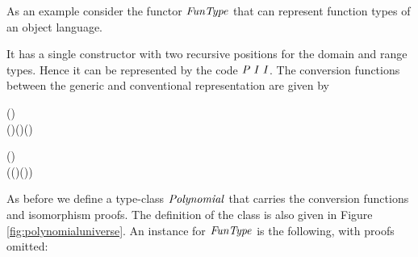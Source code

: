 As an example consider the functor \ensuremath{\Conid{FunType}} that can represent
function types of an object language.
\begin{hscode}\SaveRestoreHook
{}%
%
%
\>[3]{}\;\;\mathrel{=}\;\;\<[E]%
\ColumnHook
\end{hscode}\resethooks
It has a single constructor with two recursive positions for the
domain and range types. Hence it can be represented by the code \ensuremath{\Conid{P}\;\Conid{I}\;\Conid{I}}. The conversion functions between the generic and conventional
representation are given by
\begin{hscode}\SaveRestoreHook
{}%
%
%
\>[3]{}\mathbin{::}\;\to {}\;(\;\;)\;\<[E]%
\\
\>[3]{}\;(\;\;)\mathrel{=}\;(\;)\;(\;){}\<[E]%
\ColumnHook
\end{hscode}\resethooks
\begin{hscode}\SaveRestoreHook
{}%
%
%
\>[3]{}\mathbin{::}\;(\;\;)\;\to {}\;\<[E]%
\\
\>[3]{}\;(\;(\;)\;(\;))\mathrel{=}\;\;\<[E]%
\ColumnHook
\end{hscode}\resethooks
As before we define a type-class \ensuremath{\Conid{Polynomial}} that carries the
conversion functions and isomorphism proofs. The definition of the
class is also given in Figure \ref{fig:polynomialuniverse}. An
instance for \ensuremath{\Conid{FunType}} is the following, with proofs omitted:
